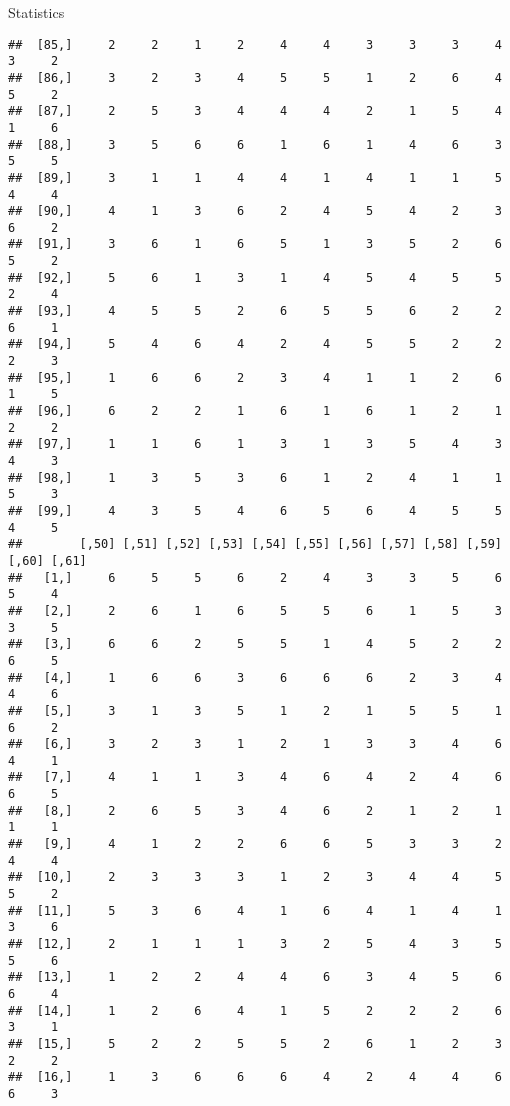 \documentclass[
  ignorenonframetext,
]{beamer}
\begin{document}
\begin{frame}[fragile]{Statistics}
\begin{verbatim}
##  [85,]     2     2     1     2     4     4     3     3     3     4     3     2
##  [86,]     3     2     3     4     5     5     1     2     6     4     5     2
##  [87,]     2     5     3     4     4     4     2     1     5     4     1     6
##  [88,]     3     5     6     6     1     6     1     4     6     3     5     5
##  [89,]     3     1     1     4     4     1     4     1     1     5     4     4
##  [90,]     4     1     3     6     2     4     5     4     2     3     6     2
##  [91,]     3     6     1     6     5     1     3     5     2     6     5     2
##  [92,]     5     6     1     3     1     4     5     4     5     5     2     4
##  [93,]     4     5     5     2     6     5     5     6     2     2     6     1
##  [94,]     5     4     6     4     2     4     5     5     2     2     2     3
##  [95,]     1     6     6     2     3     4     1     1     2     6     1     5
##  [96,]     6     2     2     1     6     1     6     1     2     1     2     2
##  [97,]     1     1     6     1     3     1     3     5     4     3     4     3
##  [98,]     1     3     5     3     6     1     2     4     1     1     5     3
##  [99,]     4     3     5     4     6     5     6     4     5     5     4     5
##        [,50] [,51] [,52] [,53] [,54] [,55] [,56] [,57] [,58] [,59] [,60] [,61]
##   [1,]     6     5     5     6     2     4     3     3     5     6     5     4
##   [2,]     2     6     1     6     5     5     6     1     5     3     3     5
##   [3,]     6     6     2     5     5     1     4     5     2     2     6     5
##   [4,]     1     6     6     3     6     6     6     2     3     4     4     6
##   [5,]     3     1     3     5     1     2     1     5     5     1     6     2
##   [6,]     3     2     3     1     2     1     3     3     4     6     4     1
##   [7,]     4     1     1     3     4     6     4     2     4     6     6     5
##   [8,]     2     6     5     3     4     6     2     1     2     1     1     1
##   [9,]     4     1     2     2     6     6     5     3     3     2     4     4
##  [10,]     2     3     3     3     1     2     3     4     4     5     5     2
##  [11,]     5     3     6     4     1     6     4     1     4     1     3     6
##  [12,]     2     1     1     1     3     2     5     4     3     5     5     6
##  [13,]     1     2     2     4     4     6     3     4     5     6     6     4
##  [14,]     1     2     6     4     1     5     2     2     2     6     3     1
##  [15,]     5     2     2     5     5     2     6     1     2     3     2     2
##  [16,]     1     3     6     6     6     4     2     4     4     6     6     3

\end{verbatim}
\end{frame}
\end{document}
